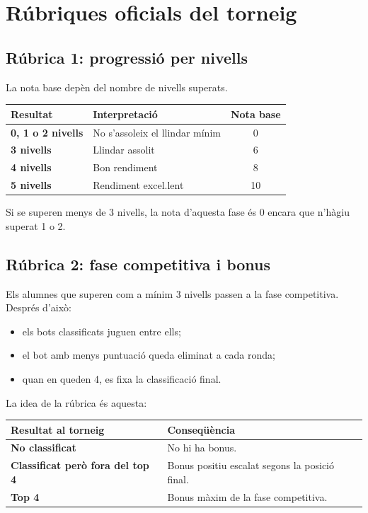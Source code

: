 \documentclass[12pt,a4paper]{report}
\begin{document}
\chapter{Rúbriques oficials del torneig}

\section{Rúbrica 1: progressió per nivells}

La nota base depèn del nombre de nivells superats.

\begin{center}
\begin{tabularx}{0.92\textwidth}{>{\bfseries}l Y c}
\toprule
Resultat & Interpretació & Nota base \\
, 1 o 2 nivells & No s'assoleix el llindar mínim & 0 \\
3 nivells & Llindar assolit & 6 \\
4 nivells & Bon rendiment & 8 \\
5 nivells & Rendiment excel.lent & 10 \\
\bottomrule
\end{tabularx}
\end{center}

\begin{tcolorbox}[colback=softyellow,colframe=upcblue,title=Regla de llindar]
Si se superen menys de 3 nivells, la nota d'aquesta fase és 0 encara que n'hàgiu
superat 1 o 2.
\end{tcolorbox}

\section{Rúbrica 2: fase competitiva i bonus}

Els alumnes que superen com a mínim 3 nivells passen a la fase competitiva.
Després d'això:

\begin{itemize}
  \item els bots classificats juguen entre ells;
  \item el bot amb menys puntuació queda eliminat a cada ronda;
  \item quan en queden 4, es fixa la classificació final.
\end{itemize}

La idea de la rúbrica és aquesta:

\begin{center}
\begin{tabularx}{0.92\textwidth}{>{\bfseries}l Y}
\toprule
Resultat al torneig & Conseqüència \\
\midrule
No classificat & No hi ha bonus. \\
Classificat però fora del top 4 & Bonus positiu escalat segons la posició final. \\
Top 4 & Bonus màxim de la fase competitiva. \\
\bottomrule
\end{tabularx}
\end{center}
\end{document}
